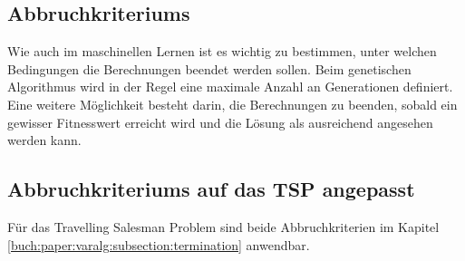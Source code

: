 %
%
%
%
\subsection{Abbruchkriteriums
\label{buch:paper:varalg:subsection:termination}}
Wie auch im maschinellen Lernen ist es wichtig zu bestimmen, unter 
welchen Bedingungen die Berechnungen beendet werden sollen. Beim 
genetischen Algorithmus wird in der Regel eine maximale Anzahl an 
Generationen definiert. Eine weitere Möglichkeit besteht darin, 
die Berechnungen zu beenden, sobald ein gewisser Fitnesswert erreicht 
wird und die Lösung als ausreichend angesehen werden kann.

\subsection{Abbruchkriteriums auf das TSP angepasst
\label{buch:paper:varalg:subsection:termination_tsp}}
Für das Travelling Salesman Problem sind beide Abbruchkriterien im 
Kapitel \ref{buch:paper:varalg:subsection:termination} anwendbar.

